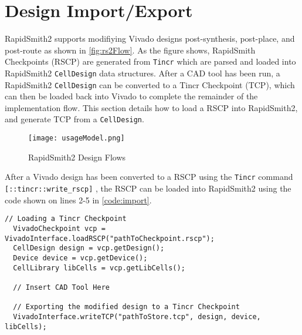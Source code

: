 \newpage

\section{Design Import/Export} \label{sec:import}

RapidSmith2 supports modifiying Vivado designs post-synthesis, post-place, and
post-route as shown in \autoref{fig:rs2Flow}. As the figure shows, RapidSmith
Checkpoints (RSCP) are generated from \texttt{Tincr} which are parsed and loaded
into RapidSmith2 \texttt{CellDesign} data structures. After a CAD tool has been
run, a RapidSmith2 \texttt{CellDesign} can be converted to a Tincr Checkpoint
(TCP), which can then be loaded back into Vivado to complete the remainder of
the implementation flow. This section details how to load a RSCP into
RapidSmith2, and generate TCP from a \texttt{CellDesign}.

\begin{figure}[htb]
\centering
\texttt{[image: usageModel.png]}
\caption{RapidSmith2 Design Flows}
\label{fig:rs2Flow}
\end{figure}

After a Vivado design has been converted to a RSCP using the \texttt{Tincr}
command \texttt{[::tincr\-::write\_rscp]} , the RSCP can be loaded into
RapidSmith2 using the code shown on lines 2-5 in \autoref{code:import}.

\begin{lstlisting}[xleftmargin=1.5em, framexleftmargin=1.5em, caption=How to
import and export TCP files to and from RapidSmith2, label=code:import]
  // Loading a Tincr Checkpoint
  VivadoCheckpoint vcp = VivadoInterface.loadRSCP("pathToCheckpoint.rscp");
  CellDesign design = vcp.getDesign();
  Device device = vcp.getDevice();
  CellLibrary libCells = vcp.getLibCells();

  // Insert CAD Tool Here

  // Exporting the modified design to a Tincr Checkpoint
  VivadoInterface.writeTCP("pathToStore.tcp", design, device, libCells);
\end{lstlisting}

